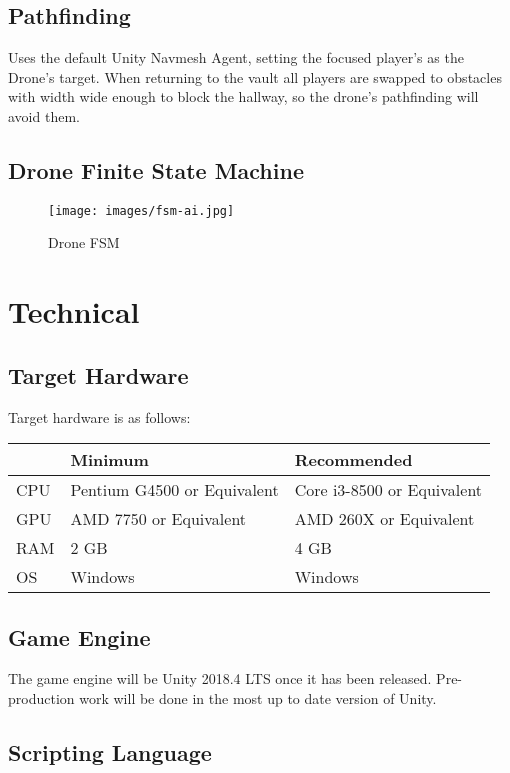 \documentclass[14pt]{report}
\begin{document}
\section{Pathfinding}

Uses the default Unity Navmesh Agent, setting the focused player’s as the Drone’s target. When returning to the vault all players are swapped to obstacles with width wide enough to block the hallway, so the drone’s pathfinding will avoid them.

\section{Drone Finite State Machine}

\begin{figure}[h!]
	\texttt{[image: images/fsm-ai.jpg]}
	\caption{Drone FSM}
\end{figure}

\chapter{Technical}

\section{Target Hardware}

Target hardware is as follows:

\begin{tabular}{|l|l|l|}
    \hline
     & Minimum & Recommended \\ \hline
     CPU & Pentium G4500 or Equivalent & Core i3-8500 or Equivalent \\ \hline
     GPU & AMD 7750 or Equivalent & AMD 260X or Equivalent \\ \hline
     RAM & 2 GB & 4 GB \\ \hline
     OS & Windows & Windows \\
    \hline
\end{tabular}

\section{Game Engine}

The game engine will be Unity 2018.4 LTS once it has been released. Pre-production work will be done in the most up to date version of Unity.

\section{Scripting Language}
\end{document}
